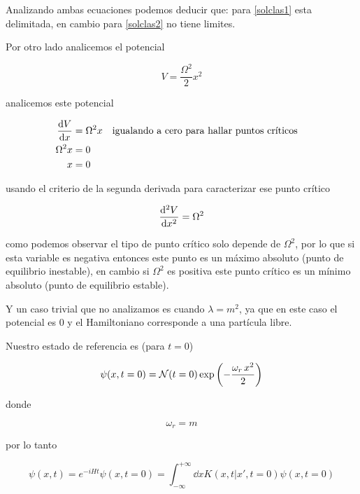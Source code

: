 \documentclass[../Main.tex]{subfiles}
\begin{document}
Analizando ambas ecuaciones podemos deducir que: para \eqref{solclas1} esta delimitada, en cambio para \eqref{solclas2} no tiene limites.

Por otro lado analicemos el potencial

\begin{equation}
V=\dfrac{\Omega^2}{2} x^2
\end{equation} 

analicemos este potencial

\begin{equation}
\begin{split}
\dv{V}{x}&=\Omega^2 x \qq{igualando a cero para hallar puntos críticos}\\
\Omega^2 x&=0 \\
x&=0
\end{split}
\end{equation}

usando el criterio de la segunda derivada para caracterizar ese punto crítico

\begin{equation}
\dv[2]{V}{x}=\Omega^2
\end{equation}

como podemos observar el tipo de punto crítico solo depende de $\Omega^2$, por lo que si esta variable es negativa entonces este punto es un máximo absoluto (punto de equilibrio inestable), en cambio si $\Omega^2$ es positiva este punto crítico es un mínimo absoluto (punto de equilibrio estable).

Y un caso trivial que no analizamos es cuando $\lambda=m^2$, ya que en este caso el potencial es 0 y el Hamiltoniano corresponde a una partícula libre.

Nuestro estado de referencia es (para $ t=0 $)

\begin{equation}
\psi(x,t=0)=\mathcal{N}(t=0)\exp \pqty{- \frac{\omega_{r} \, x^2}{2}}
\label{reference}
\end{equation}

donde

\begin{equation}
\omega_r=m
\end{equation}

por lo tanto

\begin{equation}
\psi (x,t)=e^{-iHt}\psi (x,t=0)=\int_{-\infty}^{+\infty}\dd{x}K(x,t|x',t=0)\psi (x,t=0)
\end{equation}
\end{document}
